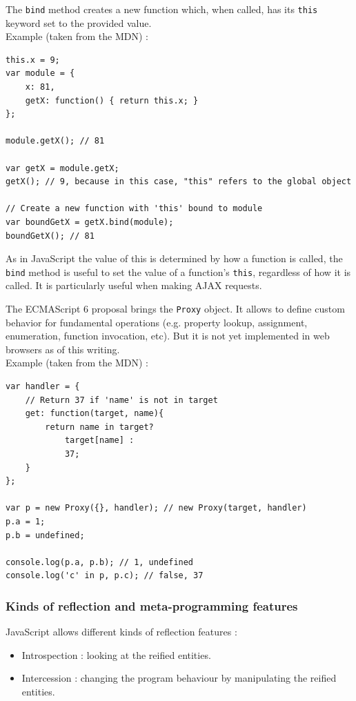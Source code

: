 \documentclass[a4paper,10pt]{article}
\begin{document}
\medskip
\label{bind}
The \lstinline|bind| method creates a new function which, when called, has its \lstinline|this| keyword set to the provided value. \\
Example (taken from the MDN) : \\
\begin{lstlisting}
this.x = 9;
var module = {
	x: 81,
	getX: function() { return this.x; }
};

module.getX(); // 81

var getX = module.getX;
getX(); // 9, because in this case, "this" refers to the global object

// Create a new function with 'this' bound to module
var boundGetX = getX.bind(module);
boundGetX(); // 81
\end{lstlisting}

As in JavaScript the value of this is determined by how a function is called, the \lstinline|bind| method is useful to set the value of a function’s \lstinline|this|, regardless of how it is called.
It is particularly useful when making AJAX requests.


The ECMAScript 6 proposal brings the \lstinline|Proxy| object.
It allows to define custom behavior for fundamental operations (e.g. property lookup, assignment, enumeration, function invocation, etc).
But it is not yet implemented in web browsers as of this writing. \\
Example (taken from the MDN) : \\
\begin{lstlisting}
var handler = {
    // Return 37 if 'name' is not in target
    get: function(target, name){
        return name in target?
            target[name] :
            37;
    }
};

var p = new Proxy({}, handler); // new Proxy(target, handler)
p.a = 1;
p.b = undefined;

console.log(p.a, p.b); // 1, undefined
console.log('c' in p, p.c); // false, 37
\end{lstlisting}



\subsubsection{Kinds of reflection and meta-programming features}

JavaScript allows different kinds of reflection features :
\begin{itemize}
    \item Introspection : looking at the reified entities.
    \item Intercession : changing the program behaviour by manipulating the reified entities.
\end{itemize}
\end{document}
